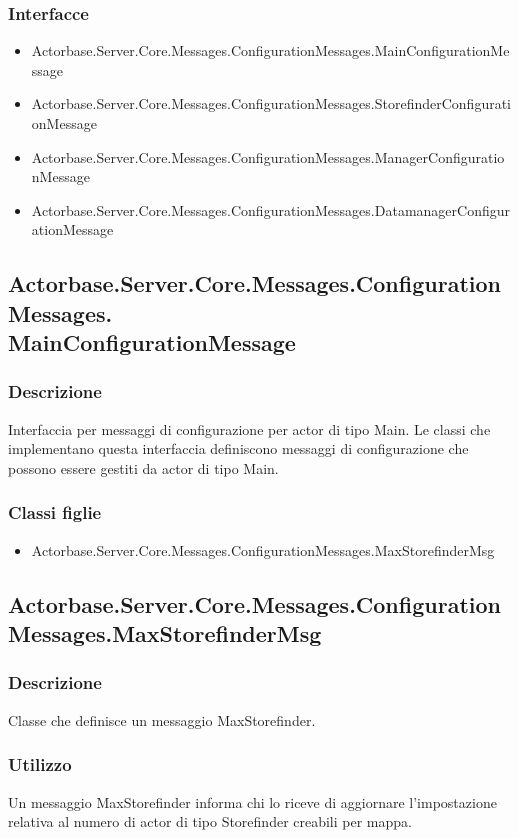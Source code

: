 \documentclass[a4paper]{article}
\begin{document}
			\subsubsection{Interfacce}
			\begin{itemize}
				\item Actorbase.Server.Core.Messages.ConfigurationMessages.MainConfigurationMessage
				\item Actorbase.Server.Core.Messages.ConfigurationMessages.StorefinderConfigurationMessage
				\item Actorbase.Server.Core.Messages.ConfigurationMessages.ManagerConfigurationMessage
				\item Actorbase.Server.Core.Messages.ConfigurationMessages.DatamanagerConfigurationMessage
			\end{itemize}

			\subsection{Actorbase.Server.Core.Messages.ConfigurationMessages.\\ MainConfigurationMessage}
			\subsubsection{Descrizione}
				Interfaccia per messaggi di configurazione per actor di tipo Main. 
				Le classi che implementano questa interfaccia definiscono messaggi di configurazione che possono essere gestiti da actor di tipo Main.
			\subsubsection{Classi figlie}
			\begin{itemize}
				\item Actorbase.Server.Core.Messages.ConfigurationMessages.MaxStorefinderMsg
			\end{itemize}

			\subsection{Actorbase.Server.Core.Messages.ConfigurationMessages.MaxStorefinderMsg}
			\subsubsection{Descrizione}
				Classe che definisce un messaggio MaxStorefinder.
			\subsubsection{Utilizzo}
				Un messaggio MaxStorefinder informa chi lo riceve di aggiornare l'impostazione relativa al numero di actor di tipo Storefinder creabili per mappa.
\end{document}
